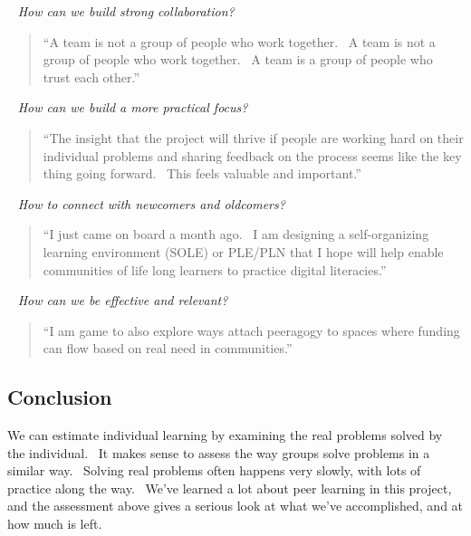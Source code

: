 ~ \emph{How can we build strong
collaboration?} 

\begin{quote}
``A team is not a group of people who work together.~ A
team is not a group of people who work together.~ A team is a group of
people who trust each other.''
\end{quote}

~ \emph{How can we build
a more practical focus?}
\begin{quote}
``The insight that the project will thrive if people are working hard
  on their individual problems and sharing feedback on the process
  seems like the key thing going forward.~ This feels valuable and
  important.''
\end{quote}

~ \emph{How to connect with
  newcomers and oldcomers?}
\begin{quote}
``I just came on board a month ago.~ I am designing a self-organizing
  learning environment (SOLE) or PLE/PLN that I hope will help enable
  communities of life long learners to practice digital literacies.''
\end{quote}

~ \emph{How can we be effective and
relevant?}
\begin{quote}
``I am game to also explore ways attach peeragogy to spaces where
  funding can flow based on real need in communities.''
\end{quote}

\subsection{Conclusion}

We can estimate individual learning by examining the real problems
solved by the individual.~ It makes sense to assess the way groups solve
problems in a similar way.~ Solving real problems often happens very
slowly, with lots of practice along the way.~ We've learned a lot about
peer learning in this project, and the assessment above gives a serious
look at what we've accomplished, and at how much is left.
